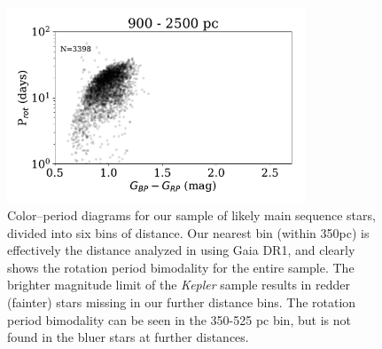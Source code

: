 \documentclass[preprint2]{aastex62}
\newcommand{\Kepler}{\textsl{Kepler}\xspace}
\begin{document}
\begin{figure}[]
\includegraphics[width=3.5in]{../figures/rot_dist_900}
\caption{Color--period diagrams for our sample of likely main sequence stars, divided into six bins of distance. Our nearest bin (within 350pc) is effectively the distance analyzed in \citet{davenport2017} using Gaia DR1, and clearly shows the rotation period bimodality for the entire sample. The brighter magnitude limit of the \Kepler sample results in redder (fainter) stars missing in our further distance bins. The rotation period bimodality can be seen in the 350-525 pc bin, but is not found in the bluer stars at further distances.
}
\label{fig:color_period}
\end{figure}
\end{document}
